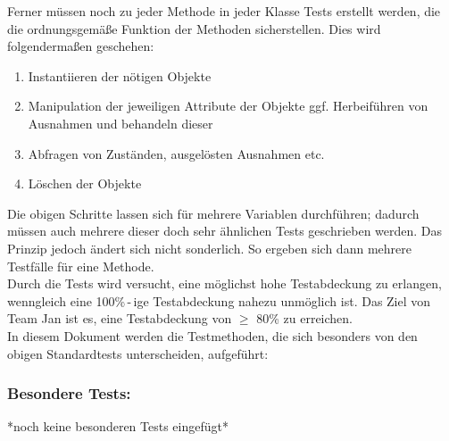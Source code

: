 \documentclass[a4paper, 12pt]{article}
\begin{document}
	Ferner müssen noch zu jeder Methode in jeder Klasse Tests erstellt werden, die die 
	ordnungsgemäße Funktion der Methoden sicherstellen. Dies wird folgendermaßen geschehen:
	\begin{enumerate}
		\item Instantiieren der nötigen Objekte
		\item Manipulation der jeweiligen Attribute der Objekte
		\subitem ggf. Herbeiführen von Ausnahmen und behandeln dieser
		\item Abfragen von Zuständen, ausgelösten Ausnahmen etc.
		\item Löschen der Objekte
	\end{enumerate}
	Die obigen Schritte lassen sich für mehrere Variablen durchführen; dadurch müssen 
	auch mehrere dieser doch sehr ähnlichen Tests geschrieben werden. Das Prinzip jedoch
	ändert sich nicht sonderlich. So ergeben sich dann mehrere Testfälle für eine Methode.\\
	Durch die Tests wird versucht, eine möglichst hohe Testabdeckung zu erlangen, wenngleich
	eine 100\%\,-\,ige Testabdeckung nahezu unmöglich ist. Das Ziel von Team Jan ist es,
	eine Testabdeckung von $\geq$ 80\% zu erreichen.\\
	In diesem Dokument werden die Testmethoden, die sich besonders von den obigen 
	Standardtests unterscheiden, aufgeführt:\\
	\subsubsection{Besondere Tests: }
	
	*noch keine besonderen Tests eingefügt*
	
\end{document}
